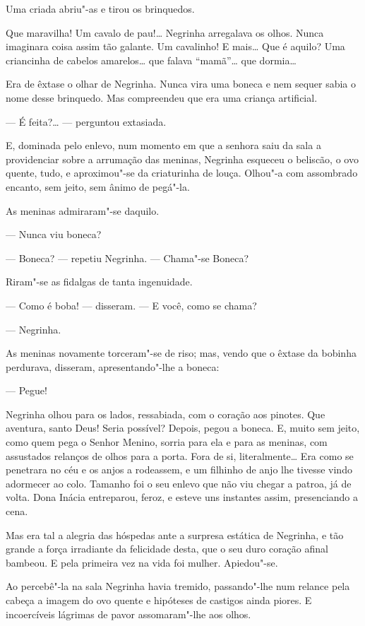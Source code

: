 Uma criada abriu"-as e tirou os brinquedos.

Que maravilha! Um cavalo de pau!\ldots{} Negrinha arregalava os olhos. Nunca
imaginara coisa assim tão galante. Um cavalinho! E mais\ldots{} Que é aquilo?
Uma criancinha de cabelos amarelos\ldots{} que falava ``mamã''\ldots{} que
dormia\ldots{}

Era de êxtase o olhar de Negrinha. Nunca vira uma boneca e nem sequer
sabia o nome desse brinquedo. Mas compreendeu que era uma criança
artificial.

--- É feita?\ldots{} --- perguntou extasiada.

E, dominada pelo enlevo, num momento em que a senhora saiu da sala a
providenciar sobre a arrumação das meninas, Negrinha esqueceu o
beliscão, o ovo quente, tudo, e aproximou"-se da criaturinha de louça.
Olhou"-a com assombrado encanto, sem jeito, sem ânimo de pegá"-la.

As meninas admiraram"-se daquilo.

--- Nunca viu boneca?

--- Boneca? --- repetiu Negrinha. --- Chama"-se Boneca?

Riram"-se as fidalgas de tanta ingenuidade.

--- Como é boba! --- disseram. --- E você, como se chama?

--- Negrinha.

As meninas novamente torceram"-se de riso; mas, vendo que o êxtase da
bobinha perdurava, disseram, apresentando"-lhe a boneca:

--- Pegue!

Negrinha olhou para os lados, ressabiada, com o coração aos pinotes. Que
aventura, santo Deus! Seria possível? Depois, pegou a boneca. E, muito
sem jeito, como quem pega o Senhor Menino, sorria para ela e para as
meninas, com assustados relanços de olhos para a porta. Fora de si,
literalmente\ldots{} Era como se penetrara no céu e os anjos a rodeassem, e
um filhinho de anjo lhe tivesse vindo adormecer ao colo. Tamanho foi o
seu enlevo que não viu chegar a patroa, já de volta. Dona Inácia
entreparou, feroz, e esteve uns instantes assim, presenciando a cena.

Mas era tal a alegria das hóspedas ante a surpresa estática de Negrinha,
e tão grande a força irradiante da felicidade desta, que o seu duro
coração afinal bambeou. E pela primeira vez na vida foi mulher.
Apiedou"-se.

Ao percebê"-la na sala Negrinha havia tremido, passando"-lhe num relance
pela cabeça a imagem do ovo quente e hipóteses de castigos ainda piores.
E incoercíveis lágrimas de pavor assomaram"-lhe aos olhos.

